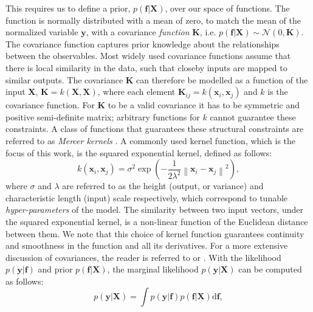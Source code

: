 \documentclass[useAMS,usenatbib,fleqn]{mn2e}
\begin{document}
This requires us to define a prior, $p\left(\mathbf{f}|\mathbf{X}\right)$, over our space of functions. The function is normally distributed with a mean of zero, to match the mean of the normalized variable $\mathbf{y}$, with a covariance \emph{function} $\mathbf{K}$, i.e. $p\left(\mathbf{f}|\mathbf{X}\right)\sim\mathcal{N} \left(0,\mathbf{K}\right)$. The covariance function captures prior knowledge about the relationships between the observables. Most widely used covariance functions assume that there is local similarity in the data, such that closeby inputs are mapped to similar outputs. The covariance $\mathbf{K}$ can therefore be modelled as a function of the input $\mathbf{X}$, $\mathbf{K}=k\left(\mathbf{X},\mathbf{X}\right)$, where each element $\mathbf{K}_{ij}=k\left(\mathbf{x}_{i},\mathbf{x}_{j}\right)$ and $k$ is the covariance function. For $\mathbf{K}$ to be a valid covariance it has to be symmetric and positive semi-definite matrix; arbitrary functions for $k$ cannot guarantee these constraints. A class of functions that guarantees these structural constraints are referred to as \emph{Mercer kernels} \citep{mercer1909}. A commonly used kernel function, which is the focus of this work, is the squared exponential kernel, defined as follows:
\begin{equation}
k\left(\mathbf{x}_{i},\mathbf{x}_{j}\right) = \sigma^{2}\exp\left(-\frac{1}{2\lambda^{2}}\left\|\mathbf{x}_{i}-\mathbf{x}_{j}\right\|^{2}\right),
\label{eq-squared-exponential}
\end{equation}
where $\sigma$ and $\lambda$ are referred to as the height (output, or variance) and characteristic length (input) scale respectively, which correspond to tunable \emph{hyper-parameters} of the model. The similarity between two input vectors, under the squared exponential kernel, is a non-linear function of the Euclidean distance between them. We note that this choice of kernel function guarantees continuity and smoothness in the function and all its derivatives. For a more extensive discussion of covariances, the reader is referred to \citep{rasmussen2006gaussian} or \citep{roberts2012rs}. With the likelihood $p\left(\mathbf{y}|\mathbf{f}\right)$ and prior $p\left(\mathbf{f}|\mathbf{X}\right)$, the marginal likelihood $p\left(\mathbf{y}|\mathbf{X}\right)$ can be computed as follows:
\begin{equation}
p\left(\mathbf{y}|\mathbf{X}\right) = \int p\left(\mathbf{y}|\mathbf{f}\right)p\left(\mathbf{f}|\mathbf{X}\right) \mathrm{d}\mathbf{f},
\end{equation}
\end{document}
